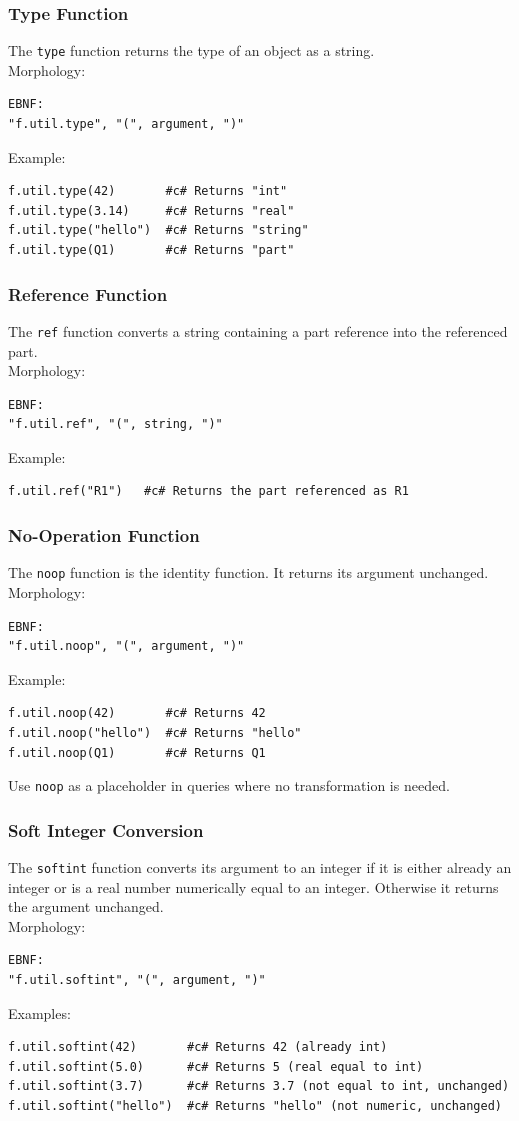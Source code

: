 \subsubsection{Type Function}
The \texttt{type} function returns the type of an object as a string. \\
Morphology:
\begin{verbatim}
EBNF:
"f.util.type", "(", argument, ")"
\end{verbatim}
Example:
\begin{verbatim}
f.util.type(42)       #c# Returns "int"
f.util.type(3.14)     #c# Returns "real"
f.util.type("hello")  #c# Returns "string"
f.util.type(Q1)       #c# Returns "part"
\end{verbatim}

\subsubsection{Reference Function}
The \texttt{ref} function converts a string containing a part reference into the referenced part. \\
Morphology:
\begin{verbatim}
EBNF:
"f.util.ref", "(", string, ")"
\end{verbatim}
Example:
\begin{verbatim}
f.util.ref("R1")   #c# Returns the part referenced as R1
\end{verbatim}

\subsubsection{No-Operation Function}
The \texttt{noop} function is the identity function. It returns its argument unchanged. \\
Morphology:
\begin{verbatim}
EBNF:
"f.util.noop", "(", argument, ")"
\end{verbatim}
Example:
\begin{verbatim}
f.util.noop(42)       #c# Returns 42
f.util.noop("hello")  #c# Returns "hello"
f.util.noop(Q1)       #c# Returns Q1
\end{verbatim}
Use \texttt{noop} as a placeholder in queries where no transformation is needed.

\subsubsection{Soft Integer Conversion}
The \texttt{softint} function converts its argument to an integer if it is either already an integer or is a real number numerically equal to an integer. Otherwise it returns the argument unchanged. \\
Morphology:
\begin{verbatim}
EBNF:
"f.util.softint", "(", argument, ")"
\end{verbatim}
Examples:
\begin{verbatim}
f.util.softint(42)       #c# Returns 42 (already int)
f.util.softint(5.0)      #c# Returns 5 (real equal to int)
f.util.softint(3.7)      #c# Returns 3.7 (not equal to int, unchanged)
f.util.softint("hello")  #c# Returns "hello" (not numeric, unchanged)
\end{verbatim}

